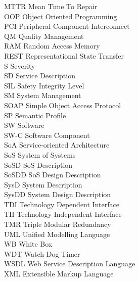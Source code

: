 MTTR \tocdotfill Mean Time To Repair\\
OOP \tocdotfill Object Oriented Programming\\
PCI \tocdotfill Peripheral Component Interconnect\\
QM \tocdotfill Quality Management\\
RAM \tocdotfill Random Access Memory\\
REST \tocdotfill Representational State Transfer\\
S \tocdotfill Severity\\
SD \tocdotfill Service Description\\
SIL \tocdotfill Safety Integrity Level\\
SM \tocdotfill System Management\\
SOAP \tocdotfill Simple Object Access Protocol\\
SP \tocdotfill Semantic Profile\\
SW \tocdotfill Software\\
SW-C \tocdotfill Software Component\\
SoA \tocdotfill Service-oriented Architecture\\
SoS \tocdotfill System of Systems\\
SoSD \tocdotfill SoS Description\\
SoSDD \tocdotfill SoS Design Description\\
SysD \tocdotfill System Description\\
SysDD \tocdotfill System Design Description\\
TDI \tocdotfill Technology Dependent Interface\\
TII \tocdotfill Technology Independent Interface\\
TMR \tocdotfill Triple Modular Redundancy\\
UML \tocdotfill Unified Modelling Language\\
WB \tocdotfill White Box\\
WDT \tocdotfill Watch Dog Timer\\
WSDL \tocdotfill Web Service Description Language\\
XML \tocdotfill Extensible Markup Language\\